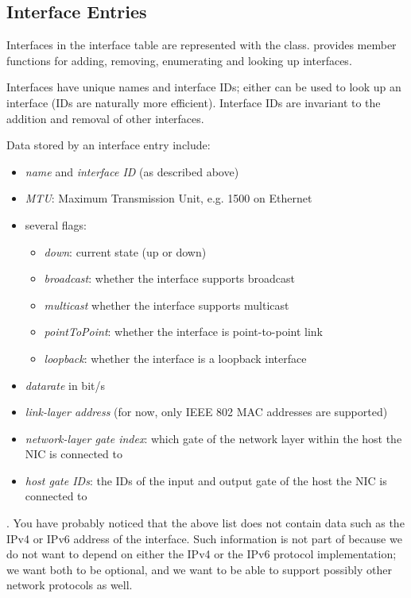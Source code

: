 \subsection{Interface Entries}

Interfaces in the interface table are represented with the
 class.  provides member
functions for adding, removing, enumerating and looking up interfaces.

Interfaces have unique names and interface IDs; either can be used to look up
an interface (IDs are naturally more efficient). Interface IDs are invariant to
the addition and removal of other interfaces.

Data stored by an interface entry include:

\begin{itemize}
  \item \textit{name} and \textit{interface ID} (as described above)
  \item \textit{MTU}: Maximum Transmission Unit, e.g. 1500 on Ethernet
  \item several flags:
    \begin{itemize}
      \item \textit{down}: current state (up or down)
      \item \textit{broadcast}: whether the interface supports broadcast
      \item \textit{multicast} whether the interface supports multicast
      \item \textit{pointToPoint}: whether the interface is point-to-point link
      \item \textit{loopback}: whether the interface is a loopback interface
    \end{itemize}
  \item \textit{datarate} in bit/s
  \item \textit{link-layer address} (for now, only IEEE 802 MAC addresses are supported)
  \item \textit{network-layer gate index}: which gate of the network layer within the host the NIC is connected to
  \item \textit{host gate IDs}: the IDs of the input and output gate of the host the NIC is connected to
\end{itemize}

. You have probably noticed that the above list does not
contain data such as the IPv4 or IPv6 address of the interface. Such
information is not part of  because we do not want
 to depend on either the IPv4 or the IPv6 protocol
implementation; we want both to be optional, and we want
 to be able to support possibly other network
protocols as well.

